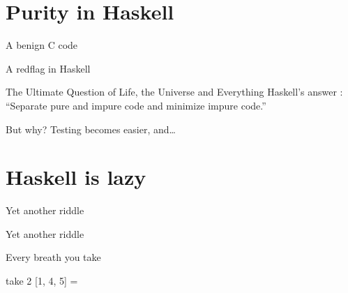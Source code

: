 \documentclass{beamer}
\begin{document}
\section{Purity in Haskell}

\begin{frame}{A benign C code}
	
\end{frame}

\begin{frame}{A redflag in Haskell}
	
\end{frame}

\begin{frame}{The Ultimate Question of Life, the Universe and Everything}
	Haskell's answer : ``Separate pure and impure code and minimize impure code.''
\end{frame}

\begin{frame}{But why?}
	Testing becomes easier, and\ldots

\end{frame}

\section{Haskell is lazy}

\begin{frame}{Yet another riddle}
	
\end{frame}

\begin{frame}{Yet another riddle}
	

	 \onslide<3->{[]}

	 \onslide<5->{[]}

	  \onslide<7->{2:[] = [2]}

\end{frame}


\begin{frame}{Every breath you take}
	

	take 2 [1, 4, 5] = \onslide<2->{1:take 1 [4, 5]}

\end{frame}
\end{document}
